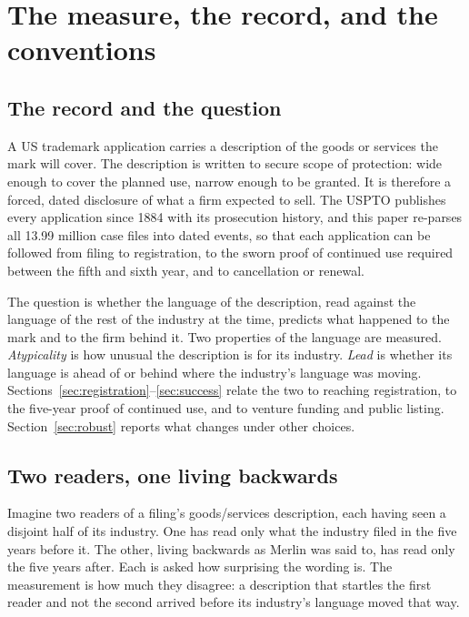 \section{The measure, the record, and the conventions}\label{sec:construct}\label{sec:measure}

\subsection{The record and the question}

A US trademark application carries a description of the goods or services
the mark will cover. The description is written to secure scope of
protection: wide enough to cover the planned use, narrow enough to be
granted. It is therefore a forced, dated disclosure of what a firm expected
to sell. The USPTO publishes every application since 1884 with its
prosecution history, and this paper re-parses all 13.99 million case files
into dated events, so that each application can be followed from filing to
registration, to the sworn proof of continued use required between the fifth
and sixth year, and to cancellation or renewal.

The question is whether the language of the description, read against the
language of the rest of the industry at the time, predicts what happened to
the mark and to the firm behind it. Two properties of the language are
measured. \emph{Atypicality} is how unusual the description is for its
industry. \emph{Lead} is whether its language is ahead of or behind where the
industry's language was moving. Sections~\ref{sec:registration}--\ref{sec:success}
relate the two to reaching registration, to the five-year proof of continued
use, and to venture funding and public listing. Section~\ref{sec:robust}
reports what changes under other choices.

\subsection{Two readers, one living backwards}

Imagine two readers of a filing's goods/services description, each having seen
a disjoint half of its industry. One has read only what the industry filed in
the five years before it. The other, living backwards as Merlin was said to,
has read only the five years after. Each is asked how surprising the wording
is. The measurement is how much they disagree: a description that startles the
first reader and not the second arrived before its industry's language moved
that way.


